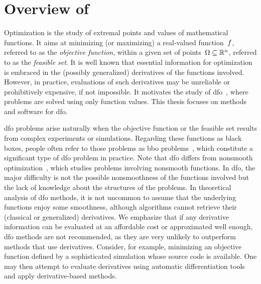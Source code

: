 %
%
%
%
%
%
%
%
%
%
%

\section{Overview of }
\label{sec:overview}

Optimization is the study of extremal points and values of mathematical functions.
It aims at minimizing (or maximizing) a real-valued function~$f$, referred to as the \emph{objective function}, within a given set of points~$\Omega \subseteq \mathbb{R}^n$, referred to as the \emph{feasible set}.
It is well known that essential information for optimization is embraced in the (possibly generalized) derivatives of the functions involved.
However, in practice, evaluations of such derivatives may be unreliable or prohibitively expensive, if not impossible.
It motivates the study of \gls{dfo}~\cite{Conn_Scheinberg_Vicente_2009b,Audet_Hare_2017,Custodio_Scheinberg_Vicente_2017,Larson_Menickelly_Wild_2019}, where problems are solved using only function values.
This thesis focuses on methods and software for \gls{dfo}.

\Gls{dfo} problems arise naturally when the objective function or the feasible set results from complex experiments or simulations.
Regarding these functions as black boxes, people often refer to those problems as \gls{bbo} problems~\cite{Audet_Hare_2017}, which constitute a significant type of \gls{dfo} problem in practice.
Note that \gls{dfo} differs from nonsmooth optimization~\cite{Clark_1983,Cui_Pang_2021}, which studies problems involving nonsmooth functions.
In \gls{dfo}, the major difficulty is not the possible nonsmoothness of the functions involved but the lack of knowledge about the structures of the problems.
In theoretical analysis of \gls{dfo} methods, it is not uncommon to assume that the underlying functions enjoy some smoothness, although algorithms cannot retrieve their (classical or generalized) derivatives.
We emphasize that if any derivative information can be evaluated at an affordable cost or approximated well enough, \gls{dfo} methods are not recommended, as they are very unlikely to outperform methods that use derivatives.
Consider, for example, minimizing an objective function defined by a sophisticated simulation whose source code is available.
One may then attempt to evaluate derivatives using automatic differentiation tools~\cite{Griewank_2003,Griewank_Walther_2008} and apply derivative-based methods.

